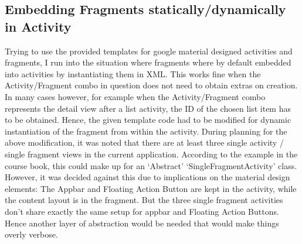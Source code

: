 \documentclass[a4paper,11pt,twoside]{article}
\begin{document}
\subsection{Embedding Fragments statically/dynamically in Activity}
Trying to use the provided templates for google material designed activities and
fragments, I run into the situation where fragments where by default embedded into
activities by instantiating them in XML. This works fine when the Activity/Fragment
combo in question does not need to obtain extras on creation. In many cases however,
for example when the Activity/Fragment combo represents the detail view after a
list activity, the ID of the chosen list item has to be obtained. Hence, the given
template code had to be modified for dynamic instantiation of the fragment from
within the activity.
During planning for the above modification, it was noted that there are at least
three single activity / single fragment views in the current application. According
to the example in the course book, this could make up for an `Abstract'
`SingleFragmentActivity' class. However, it was decided against this due to
implications on the material design elements: The Appbar and Floating Action Button
are kept in the activity, while the content layout is in the fragment. But the
three single fragment activities don't share exactly the same setup for appbar
and Floating Action Buttons. Hence another layer of abstraction would be needed that
would make things overly verbose.  



\end{document}
